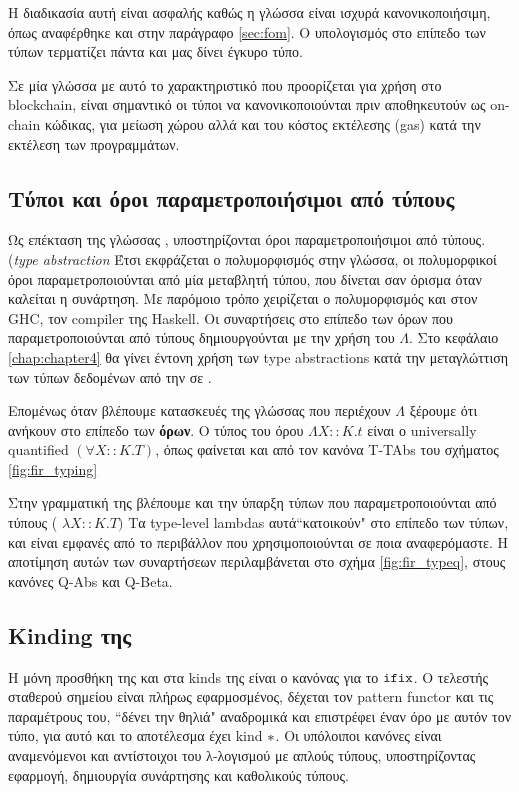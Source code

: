 Η διαδικασία αυτή είναι ασφαλής καθώς η γλώσσα \FOMF{} είναι ισχυρά κανονικοποιήσιμη, όπως αναφέρθηκε
και στην παράγραφο \ref{sec:fom}. Ο υπολογισμός στο επίπεδο των τύπων τερματίζει πάντα και μας δίνει
έγκυρο τύπο.

Σε μία γλώσσα με αυτό το χαρακτηριστικό που προορίζεται για χρήση στο blockchain, είναι σημαντικό
οι τύποι να κανονικοποιούνται πριν αποθηκευτούν ως on-chain κώδικας, για μείωση χώρου αλλά
και του κόστος εκτέλεσης (gas) κατά την εκτέλεση των προγραμμάτων.


\subsection{Τύποι και όροι παραμετροποιήσιμοι από τύπους}

Ως επέκταση της γλώσσας \FOM, υποστηρίζονται όροι παραμετροποιήσιμοι από τύπους.
(\emph{type abstraction}
Έτσι εκφράζεται ο πολυμορφισμός στην γλώσσα, οι πολυμορφικοί όροι παραμετροποιούνται
από μία μεταβλητή τύπου, που δίνεται σαν όρισμα όταν καλείται η συνάρτηση. Με παρόμοιο
τρόπο χειρίζεται ο πολυμορφισμός και στον GHC, τον compiler της Haskell. Οι συναρτήσεις
στο επίπεδο των όρων που παραμετροποιούνται από τύπους δημιουργούνται με την χρήση
του $\Lambda$. Στο κεφάλαιο \ref{chap:chapter4} θα γίνει έντονη χρήση των type abstractions
κατά την μεταγλώττιση των τύπων δεδομένων από την \FIR{} σε \FOMF{}.


Επομένως όταν
βλέπουμε κατασκευές της γλώσσας που περιέχουν $\Lambda$ ξέρουμε ότι ανήκουν
στο επίπεδο των \textbf{όρων}. Ο τύπος του όρου $ \Lambda X :: K . t $ είναι ο universally
quantified $(\forall X::K.T)$, όπως φαίνεται και από τον κανόνα T-TAbs του σχήματος \ref{fig:fir_typing}

Στην γραμματική της \FOMF{} βλέπουμε και την ύπαρξη τύπων που παραμετροποιούνται από
τύπους ( $\lambda X :: K. T)$ Τα type-level lambdas αυτά``κατοικούν" στο επίπεδο των τύπων,
και είναι εμφανές από το περιβάλλον που χρησιμοποιούνται σε ποια αναφερόμαστε. Η αποτίμηση
αυτών των συναρτήσεων περιλαμβάνεται στο σχήμα \ref{fig:fir_typeq}, στους κανόνες Q-Abs και
Q-Beta.



\subsection{Kinding της \FOMF{}}

Η μόνη προσθήκη της \FOMF{} και \FIR{} στα kinds της \FOM{} είναι ο κανόνας
για το $\operatorname{\texttt{ifix}}$. Ο τελεστής σταθερού σημείου είναι πλήρως εφαρμοσμένος, δέχεται
τον pattern functor και τις παραμέτρους  του, ``δένει την θηλιά" αναδρομικά και επιστρέφει
έναν όρο με αυτόν τον τύπο, για αυτό και το αποτέλεσμα έχει kind $\operatorname{\ast}$. Οι υπόλοιποι
κανόνες είναι αναμενόμενοι και αντίστοιχοι του λ-λογισμού με απλούς τύπους, υποστηρίζοντας
εφαρμογή, δημιουργία συνάρτησης και καθολικούς τύπους.

\vspace{1cm}

